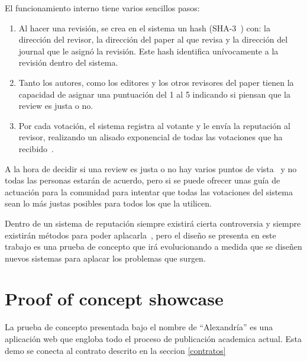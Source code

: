 El funcionamiento interno tiene varios sencillos pasos:
\begin{enumerate}
\item Al hacer una revisión, se crea en el sistema un hash
  (SHA-3~\cite{aumasson2008sha}) con: la dirección del revisor, la dirección del
  paper al que revisa y la dirección del journal que le asignó la revisión. Este
  hash identifica unívocamente a la revisión dentro del sistema.
\item Tanto los autores, como los editores y los otros revisores del paper
  tienen la capacidad de asignar una puntuación del 1 al 5 indicando si piensan
  que la review es justa o no.
\item Por cada votación, el sistema registra al votante y le envía la reputación
  al revisor, realizando un alisado exponencial de todas las votaciones que ha
  recibido~\cite{gardner1985exponential}.
\end{enumerate}

A la hora de decidir si una review es justa o no hay varios puntos de
vista~\cite{daniel1993guardians,cole1979fair} y no todas las personas estarán de
acuerdo, pero si se puede ofrecer unas guía de actuación para la comunidad para
intentar que todas las votaciones del sistema sean lo más justas posibles para
todos los que la utilicen.

Dentro de un sistema de reputación siempre existirá cierta controversia y
siempre existirán métodos para poder aplacarla~\cite{dellarocas2000immunizing},
pero el diseño se presenta en este trabajo es una prueba de concepto que irá
evolucionando a medida que se diseñen nuevos sistemas para aplacar los problemas
que surgen.

\section{Proof of concept showcase}

La prueba de concepto presentada bajo el nombre de ``Alexandría'' es una
aplicación web que engloba todo el proceso de publicación academica actual. Esta
demo se conecta al contrato descrito en la seccion \ref{contratos}



